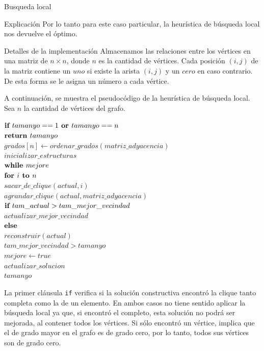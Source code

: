 \begin{section}{Busqueda local}
\begin{subsection}{Explicación}
			Por lo tanto para este caso particular, la heurística de búsqueda local nos devuelve el óptimo.


		\end{subsection}
		\begin{subsection}{Detalles de la implementación}
			Almacenamos las relaciones entre los vértices en una matriz de $n \times n$, donde $n$ es la cantidad de vértices. Cada posición $(i,j)$ de la matriz contiene un $uno$ si existe la arista $(i,j)$ y un $cero$ en caso contrario. De esta forma se le asigna un número a cada vértice.

			A continuación, se muestra el pseudocódigo de la heurística de búsqueda local.\\

			Sea $n$ la cantidad de vértices del grafo.

			\begin{pseudo}
				\tab $\textbf{if } tamanyo==1 \textbf{ or } tamanyo==n$\\
				\tab \tab $\textbf{return } tamanyo$\\
				\tab $grados[n] \leftarrow ordenar\_grados(matriz\_adyacencia)$\\
				\tab $inicializar\_estructuras$\\
				\tab $\textbf{while } mejore$\\
				\tab \tab $\textbf{for } i \textbf{ to } n$\\
				\tab \tab \tab $sacar\_de\_clique(actual,i)$\\
				\tab \tab \tab $agrandar\_clique(actual,matriz\_adyacencia)$\\
				\tab \tab \tab$\textbf{if } tam\_actual>tam\_mejor\_vecindad$\\
				\tab \tab \tab \tab $actualizar\_mejor\_vecindad$\\
				\tab \tab \tab$\textbf{else }$\\
				\tab \tab \tab \tab $reconstruir(actual)$\\
				\tab \tab \IF $tam\_mejor\_vecindad>tamanyo$\\
				\tab \tab \tab $mejore 	\leftarrow true$\\
				\tab \tab \tab $actualizar\_solucion$\\
				\tab \RET $tamanyo$\\
			\end{pseudo}

		La primer cláusula \texttt{if} verifica si la solución constructiva encontró la clique tanto completa como la de un elemento. En ambos casos no tiene sentido aplicar la búsqueda local ya que, si encontró el completo, esta solución no podrá ser mejorada, al contener todos los vértices. Si sólo encontró un vértice, implica que el de grado mayor en el grafo es de grado cero, por lo tanto, todos sus vértices son de grado cero. 


\end{subsection}
\end{section}
